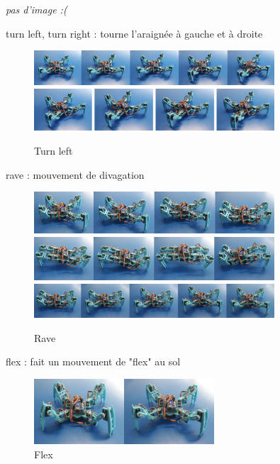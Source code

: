 \begin{center}
	\textit{pas d'image :(}
\end{center}

turn left, turn right : tourne l'araignée à gauche et à droite

\begin{figure}[H]
	\begin{center}
		\includegraphics[width=0.8\textwidth]{./img/turn_left_1}
		\includegraphics[width=0.8\textwidth]{./img/turn_left_2}
		\caption{Turn left}
	\end{center}
\end{figure}

rave : mouvement de divagation

\begin{figure}[H]
	\begin{center}
		\includegraphics[width=0.8\textwidth]{./img/rave_1}
		\includegraphics[width=0.8\textwidth]{./img/rave_2}
		\includegraphics[width=0.8\textwidth]{./img/rave_3}
		\caption{Rave}
	\end{center}
\end{figure}

flex : fait un mouvement de "flex" au sol

\begin{figure}[H]
	\begin{center}
		\includegraphics[width=0.6\textwidth]{./img/flex}
		\caption{Flex}
	\end{center}
\end{figure}

